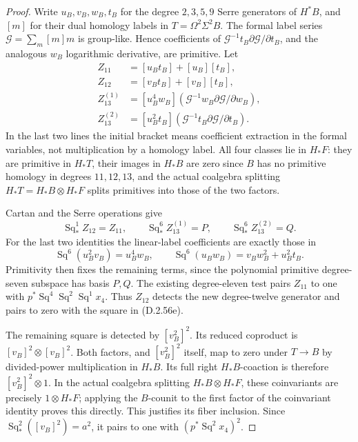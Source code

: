 \begin{proof}
Write $u_B,v_B,w_B,t_B$ for the degree $2,3,5,9$ Serre
generators of $H^*B$, and $[m]$ for their dual homology labels
in $T=\Omega^2\Sigma^2B$.  The formal label series
$\mathcal G=\sum_m[m]m$ is group-like.  Hence coefficients of
$\mathcal G^{-1}t_B\partial\mathcal G/\partial t_B$,
and the analogous $w_B$ logarithmic derivative, are primitive.
Let
\[
 \begin{aligned}
 Z_{11}&=[u_Bt_B]+[u_B][t_B],\\
 Z_{12}&=[v_Bt_B]+[v_B][t_B],\\
 Z_{13}^{(1)}&=[u_B^4w_B]
       (\mathcal G^{-1}w_B\partial\mathcal G/\partial w_B),\\
 Z_{13}^{(2)}&=[u_B^2t_B]
       (\mathcal G^{-1}t_B\partial\mathcal G/\partial t_B).
 \end{aligned}
 \tag{D.2.56f}
\]
In the last two lines the initial bracket means coefficient
extraction in the formal variables, not multiplication by a
homology label.  All four classes lie in $H_*F$: they are
primitive in $H_*T$, their images in $H_*B$ are zero since
$B$ has no primitive homology in degrees $11,12,13$, and
the actual coalgebra splitting $H_*T=H_*B\otimes H_*F$
splits primitives into those of the two factors.

Cartan and the Serre operations give
\[
 \operatorname{Sq}_*^1Z_{12}=Z_{11},\qquad
 \operatorname{Sq}_*^6Z_{13}^{(1)}=P,\qquad
 \operatorname{Sq}_*^6Z_{13}^{(2)}=Q.
 \tag{D.2.56g}
\]
For the last two identities the linear-label coefficients are
exactly those in
\[
 \operatorname{Sq}^6(u_B^2v_B)=u_B^4w_B,
 \qquad
 \operatorname{Sq}^6(u_Bw_B)=v_Bw_B^2+u_B^2t_B.
 \tag{D.2.56h}
\]
Primitivity then fixes the remaining terms, since the polynomial
primitive degree-seven subspace has basis $P,Q$.  The existing
degree-eleven test pairs $Z_{11}$ to one with
$p^*\operatorname{Sq}^4\operatorname{Sq}^2\operatorname{Sq}^1x_4$.
Thus $Z_{12}$ detects the new degree-twelve generator and pairs
to zero with the square in \textup{(D.2.56e)}.

The remaining square is detected by $[v_B^2]^2$.
Its reduced coproduct is $[v_B]^2\otimes[v_B]^2$.
Both factors, and $[v_B^2]^2$ itself, map to zero under
$T\to B$ by divided-power multiplication in $H_*B$.
Its full right $H_*B$-coaction is therefore
$[v_B^2]^2\otimes1$.  In the actual coalgebra splitting
$H_*B\otimes H_*F$, these coinvariants are precisely
$1\otimes H_*F$; applying the $B$-counit to the first
factor of the coinvariant identity proves this directly.
This justifies its fiber inclusion.  Since
$\operatorname{Sq}_*^2([v_B]^2)=a^2$, it pairs to one
with $(p^*\operatorname{Sq}^2x_4)^2$.


\end{proof}
